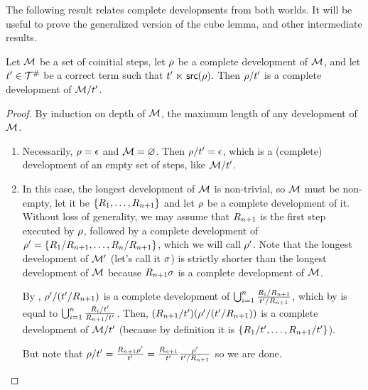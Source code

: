 The following result relates complete developments from both worlds. It will be
useful to prove the generalized version of the cube lemma, and other intermediate results.

\begin{lemma}
Let $\mathcal{M}$ be a set of coinitial steps,
let $\rho$ be a complete development of $\mathcal{M}$,
and let $t' \in \mathcal{T}^{\mathtt{\#}}$ be a correct term such that $t' \mathrel{\ltimes} \mathsf{src}(\rho)$.
Then $\rho/t'$ is a complete development of $\mathcal{M}/t'$.
\end{lemma}
\begin{proof}
By induction on depth of $\mathcal{M}$, \ie the maximum length of any development of $\mathcal{M}$.
\begin{enumerate}
  \item {} Necessarily, $\rho = \epsilon$ and $\mathcal{M} = \varnothing$.
    Then $\rho / t' = \epsilon$, which is a (complete) development of an empty set of steps,
    like $\mathcal{M} / t'$.
  \item {} In this case, the longest development of $\mathcal{M}$ is non-trivial, so
    $\mathcal{M}$ must be non-empty, let it be $\{R_1, \hdots, R_{n+1}\}$
    and let $\rho$ be a complete development of it.
    Without loss of generality, we may assume that $R_{n+1}$ is the first step executed by $\rho$,
    followed by a complete development of
    $\rho' = \{R_1 / R_{n+1}, \hdots, R_n / R_{n+1}\}$, which we will call $\rho'$.
    Note that the longest development of $\mathcal{M}'$ (let's call it $\sigma$) is strictly shorter
    than the longest development of $\mathcal{M}$ because $R_{n+1} \sigma$
    is a complete development of $\mathcal{M}$.

    By \ih, $\rho' / (t' / R_{n+1})$ is a complete development of
    $\bigcup_{i=1}^n \frac{R_i / R_{n+1}}{t' / R_{n+1}}$,
    which by  is equal to
    $\bigcup_{i=1}^n \frac{R_i / t'}{R_{n+1} / t'}$.
    Then, $(R_{n+1} / t') (\rho' / (t' / R_{n+1}))$ is a complete development of
    $\mathcal{M} / t'$ (because by definition it is $\{R_1 / t', \hdots, R_{n+1} / t'\}$).

    But note that
    $\rho / t' =
        \frac{R_{n+1}\rho'}{t'} =
        \frac{R_{n+1}}{t'} \frac{\rho'}{t' / R_{n+1}}$ so we are done.
\end{enumerate}
\end{proof}
\bigskip

